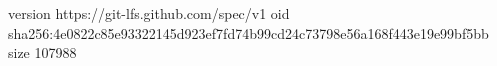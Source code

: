 version https://git-lfs.github.com/spec/v1
oid sha256:4e0822c85e93322145d923ef7fd74b99cd24c73798e56a168f443e19e99bf5bb
size 107988
